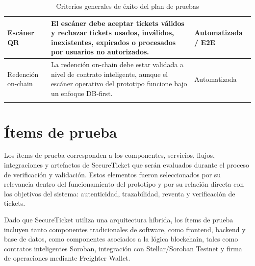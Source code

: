\documentclass[12pt,letterpaper]{article}
\newcommand{\NombreProyecto}{SecureTicket}
\begin{document}
\begin{longtable}{|
>{\raggedright\arraybackslash}p{3.1cm}|
>{\raggedright\arraybackslash}p{8.6cm}|
>{\raggedright\arraybackslash}p{2.7cm}|}
Escáner QR &
El escáner debe aceptar tickets válidos y rechazar tickets usados, inválidos, inexistentes, expirados o procesados por usuarios no autorizados. &
Automatizada / E2E \\
\hline

Redención on-chain &
La redención on-chain debe estar validada a nivel de contrato inteligente, aunque el escáner operativo del prototipo funcione bajo un enfoque DB-first. &
Automatizada \\
\hline

\caption{Criterios generales de éxito del plan de pruebas}
\label{tab:criterios-generales-exito}
\end{longtable}

\endgroup

\section{Ítems de prueba}

Los ítems de prueba corresponden a los componentes, servicios, flujos, integraciones y artefactos de \NombreProyecto{} que serán evaluados durante el proceso de verificación y validación. Estos elementos fueron seleccionados por su relevancia dentro del funcionamiento del prototipo y por su relación directa con los objetivos del sistema: autenticidad, trazabilidad, reventa y verificación de tickets.

Dado que \NombreProyecto{} utiliza una arquitectura híbrida, los ítems de prueba incluyen tanto componentes tradicionales de software, como frontend, backend y base de datos, como componentes asociados a la lógica blockchain, tales como contratos inteligentes Soroban, integración con Stellar/Soroban Testnet y firma de operaciones mediante Freighter Wallet.

\begingroup
\footnotesize
\setlength{\tabcolsep}{3pt}
\renewcommand{\arraystretch}{1.25}
\end{document}
